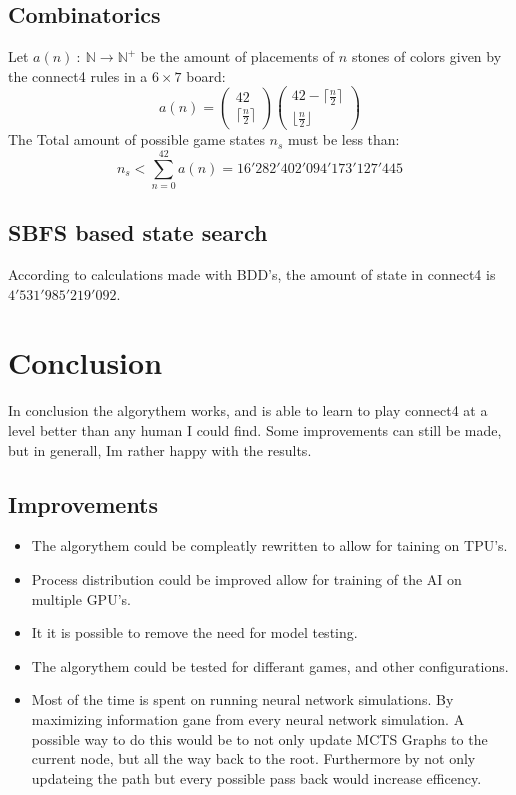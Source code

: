 \documentclass[12pt]{article}
\begin{document}
\subsection{Combinatorics}
Let \(a(n)~:~\mathbb N \to \mathbb N^+\) be the amount of placements of \(n\) stones of colors given by the connect4 rules in a \(6\times 7\) board:
\begin{equation}
a(n) = \left(\begin{matrix}
42\\
\lceil\frac{n}{2}\rceil
\end{matrix}\right)
\left(\begin{matrix}
42-\lceil\frac{n}{2}\rceil\\
\lfloor\frac{n}{2}\rfloor
\end{matrix}\right)
\end{equation}
The Total amount of possible game states \(n_s\) must be less than:
\begin{equation}
n_s < \sum_{n=0}^{42} a(n) = 16'282'402'094'173'127'445
\end{equation}
\subsection {SBFS based state search}
According to calculations made with BDD's, the amount of state in connect4 is \(4'531'985'219'092\).\cite{kissmann_2016}
\section{Conclusion}
In conclusion the algorythem works, and is able to learn to play connect4 at a level better than any human I could find. Some improvements can still be made, but in generall, Im rather happy with the results.
\subsection{Improvements}
\begin{itemize}
\item The algorythem could be compleatly rewritten to allow for taining on TPU's.
\item Process distribution could be improved allow for training of the AI on multiple GPU's.
\item It it is possible to remove the need for model testing.
\item The algorythem could be tested for differant games, and other configurations.
\item Most of the time is spent on running neural network simulations. By maximizing information gane from every neural network simulation.  A possible way to do this would be to not only update MCTS Graphs to the current node, but all the way back to the root. Furthermore by not only updateing the path but every possible pass back would increase efficency. 
\end{itemize}
\end{document}
